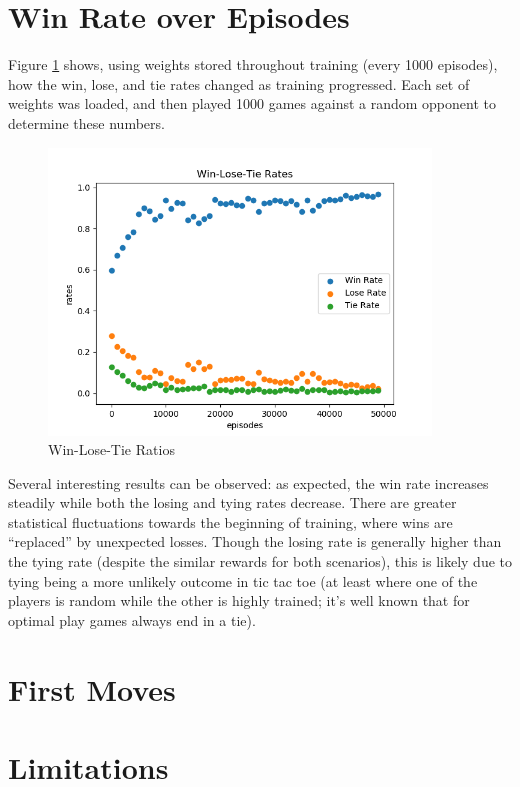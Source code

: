 \documentclass{article}
\begin{document}
   \section{Win Rate over Episodes}
   Figure \ref{fig:6} shows, using weights stored throughout training (every 1000 episodes), how the win, lose,
   and tie rates changed as training progressed. Each set of weights was loaded, and then played 1000 games against
   a random opponent to determine these numbers.
      \begin{figure}[h] \centering
          \includegraphics[width=4in]{resources/part6}
          \caption{ Win-Lose-Tie Ratios }
          \label{fig:6}
       \end{figure}
   Several interesting results can be observed: as expected, the win rate increases steadily while both the losing
   and tying rates decrease. There are greater statistical fluctuations towards the beginning of training, where
   wins are ``replaced'' by unexpected losses. Though the losing rate is generally higher than the tying rate (despite
   the similar rewards for both scenarios), this is likely due to tying being a more unlikely outcome in tic tac toe (at
   least where one of the players is random while the other is highly trained; it's well known that for optimal play
   games always end in a tie).

   \section{First Moves}
   \section{Limitations}
\end{document}
